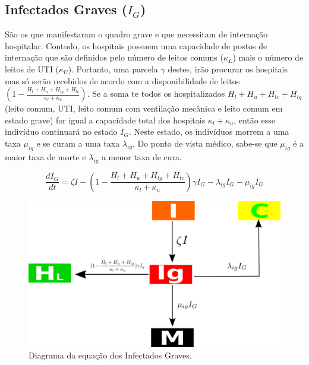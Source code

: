 \documentclass{article}
\begin{document}
\subsection{Infectados Graves ($I_G$)}
São os que manifestaram o quadro grave e que necessitam de internação hospitalar. Contudo, os hospitais possuem uma capacidade de postos de internação que são definidos pelo número de leitos comuns ($\kappa_L$) mais o número de leitos de UTI ($\kappa_U$). Portanto, uma parcela $\gamma$ destes, irão procurar os hospitais mas só serão recebidos de acordo com a disponibilidade de leitos $(1-\frac{H_l+H_u+H_{lg}+H_{lv}}{\kappa_l+\kappa_u})$. Se a soma te todos os hospitalizados  $H_l+H_u+H_{lv}+H_{lg}$ (leito comum, UTI, leito comum com ventilação mecânica e leito comum em estado grave) for igual a capacidade total dos hospitais $\kappa_l+\kappa_u$, então esse indivíduo continuará no estado $I_G$. Neste estado, os indivíduos morrem a uma taxa $\mu_{ig}$ e se curam a uma taxa $\lambda_{ig}$. Do ponto de vista médico, sabe-se que $\mu_{ig}$ é a maior taxa de morte e $\lambda_{ig}$ a menor taxa de cura.

\begin{equation}
    \frac{dI_G}{dt}= \zeta I -(1-\frac{H_l+H_u+H_{lg}+H_{lv}}{\kappa_l+\kappa_u})\gamma I_G - \lambda_{ig} I_G - \mu_{ig} I_G
\end{equation}
\begin{figure}[!h]
\centering
\includegraphics[scale=0.4]{covidIg}
\caption{Diagrama da equação dos Infectados Graves.}
\label{fig:universe}
\end{figure}
\end{document}
